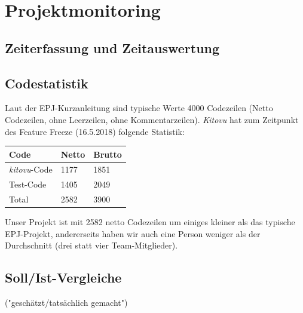 \documentclass[a4paper]{article}
\let\oldsection\section
\renewcommand\section{\clearpage\oldsection}
\begin{document}
\section{Projektmonitoring}

\subsection{Zeiterfassung und Zeitauswertung}


\subsection{Codestatistik}

Laut der EPJ-Kurzanleitung sind typische Werte 4000 Codezeilen (Netto Codezeilen, ohne Leerzeilen, ohne Kommentarzeilen). \emph{Kitovu} hat zum Zeitpunkt des Feature Freeze (16.5.2018) folgende Statistik: 

{\renewcommand{\arraystretch}{1.5}%
\begin{tabulary}{\linewidth}{l|ll}
	\bfseries Code &
	\bfseries Netto &
	\bfseries Brutto \\
	\midrule	
	
\emph{kitovu}-Code & 1177 & 1851 \\ \hline
Test-Code & 1405 & 2049 \\ \bottomrule
Total & 2582 & 3900 \\ 

\end{tabulary}}

Unser Projekt ist mit 2582 netto Codezeilen um einiges kleiner als das typische EPJ-Projekt, andererseits haben wir auch eine Person weniger als der Durchschnitt (drei statt vier Team-Mitglieder).
	


\subsection{Soll/Ist-Vergleiche}

 ("geschätzt/tatsächlich gemacht")
\end{document}
